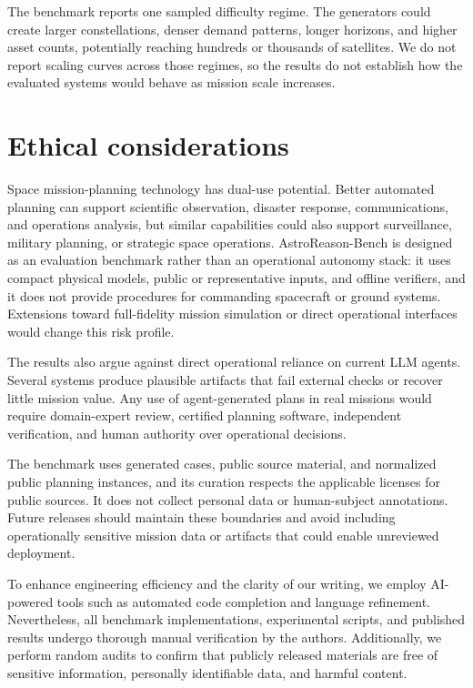 \documentclass[11pt]{article}
\begin{document}
The benchmark reports one sampled difficulty regime. The generators could create larger constellations, denser demand patterns, longer horizons, and higher asset counts, potentially reaching hundreds or thousands of satellites. We do not report scaling curves across those regimes, so the results do not establish how the evaluated systems would behave as mission scale increases.

\section*{Ethical considerations}

Space mission-planning technology has dual-use potential. Better automated planning can support scientific observation, disaster response, communications, and operations analysis, but similar capabilities could also support surveillance, military planning, or strategic space operations. AstroReason-Bench is designed as an evaluation benchmark rather than an operational autonomy stack: it uses compact physical models, public or representative inputs, and offline verifiers, and it does not provide procedures for commanding spacecraft or ground systems. Extensions toward full-fidelity mission simulation or direct operational interfaces would change this risk profile.

The results also argue against direct operational reliance on current LLM agents. Several systems produce plausible artifacts that fail external checks or recover little mission value. Any use of agent-generated plans in real missions would require domain-expert review, certified planning software, independent verification, and human authority over operational decisions.

The benchmark uses generated cases, public source material, and normalized public planning instances, and its curation respects the applicable licenses for public sources. It does not collect personal data or human-subject annotations. Future releases should maintain these boundaries and avoid including operationally sensitive mission data or artifacts that could enable unreviewed deployment.

To enhance engineering efficiency and the clarity of our writing, we employ AI-powered tools such as automated code completion and language refinement. Nevertheless, all benchmark implementations, experimental scripts, and published results undergo thorough manual verification by the authors. Additionally, we perform random audits to confirm that publicly released materials are free of sensitive information, personally identifiable data, and harmful content.
\end{document}

